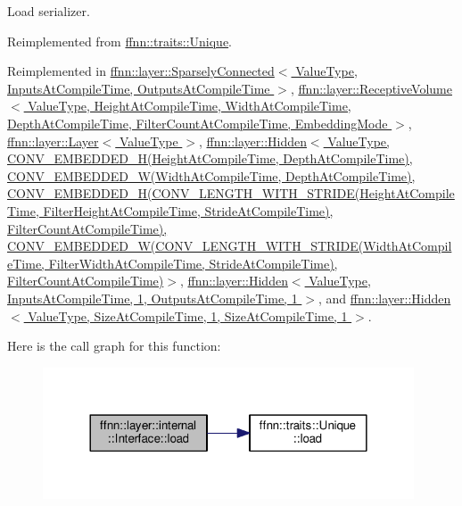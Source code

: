 Load serializer. 



Reimplemented from \hyperlink{classffnn_1_1traits_1_1_unique_af1e937c2908ed2ff707d6a7d1b5b13d2}{ffnn\-::traits\-::\-Unique}.



Reimplemented in \hyperlink{classffnn_1_1layer_1_1_sparsely_connected_a0996cd78dc2f76cab36fac2ec5c8f323}{ffnn\-::layer\-::\-Sparsely\-Connected$<$ Value\-Type, Inputs\-At\-Compile\-Time, Outputs\-At\-Compile\-Time $>$}, \hyperlink{classffnn_1_1layer_1_1_receptive_volume_aebfd8f149057b061d6880669376175e3}{ffnn\-::layer\-::\-Receptive\-Volume$<$ Value\-Type, Height\-At\-Compile\-Time, Width\-At\-Compile\-Time, Depth\-At\-Compile\-Time, Filter\-Count\-At\-Compile\-Time, Embedding\-Mode $>$}, \hyperlink{classffnn_1_1layer_1_1_layer_a23f5f3c958d888632010327471c7b012}{ffnn\-::layer\-::\-Layer$<$ Value\-Type $>$}, \hyperlink{classffnn_1_1layer_1_1_hidden_a696f61b2d9b661b7a8d6bdb3dc32b536}{ffnn\-::layer\-::\-Hidden$<$ Value\-Type, C\-O\-N\-V\-\_\-\-E\-M\-B\-E\-D\-D\-E\-D\-\_\-\-H(\-Height\-At\-Compile\-Time, Depth\-At\-Compile\-Time), C\-O\-N\-V\-\_\-\-E\-M\-B\-E\-D\-D\-E\-D\-\_\-\-W(\-Width\-At\-Compile\-Time, Depth\-At\-Compile\-Time), C\-O\-N\-V\-\_\-\-E\-M\-B\-E\-D\-D\-E\-D\-\_\-\-H(\-C\-O\-N\-V\-\_\-\-L\-E\-N\-G\-T\-H\-\_\-\-W\-I\-T\-H\-\_\-\-S\-T\-R\-I\-D\-E(\-Height\-At\-Compile\-Time, Filter\-Height\-At\-Compile\-Time, Stride\-At\-Compile\-Time), Filter\-Count\-At\-Compile\-Time), C\-O\-N\-V\-\_\-\-E\-M\-B\-E\-D\-D\-E\-D\-\_\-\-W(\-C\-O\-N\-V\-\_\-\-L\-E\-N\-G\-T\-H\-\_\-\-W\-I\-T\-H\-\_\-\-S\-T\-R\-I\-D\-E(\-Width\-At\-Compile\-Time, Filter\-Width\-At\-Compile\-Time, Stride\-At\-Compile\-Time), Filter\-Count\-At\-Compile\-Time)$>$}, \hyperlink{classffnn_1_1layer_1_1_hidden_a696f61b2d9b661b7a8d6bdb3dc32b536}{ffnn\-::layer\-::\-Hidden$<$ Value\-Type, Inputs\-At\-Compile\-Time, 1, Outputs\-At\-Compile\-Time, 1 $>$}, and \hyperlink{classffnn_1_1layer_1_1_hidden_a696f61b2d9b661b7a8d6bdb3dc32b536}{ffnn\-::layer\-::\-Hidden$<$ Value\-Type, Size\-At\-Compile\-Time, 1, Size\-At\-Compile\-Time, 1 $>$}.



Here is the call graph for this function\-:
\nopagebreak
\begin{figure}[H]
\begin{center}
\leavevmode
\includegraphics[width=312pt]{classffnn_1_1layer_1_1internal_1_1_interface_a88b5bd86aafd361d3a84dc6cba211195_cgraph}
\end{center}
\end{figure}


